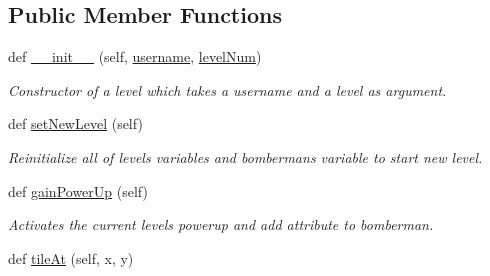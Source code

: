\subsection*{Public Member Functions}
\begin{DoxyCompactItemize}
\item 
\hypertarget{classsrc_1_1level_1_1_level_ab6e52c74e02be818576be2ffd9040fe0}{}def \hyperlink{classsrc_1_1level_1_1_level_ab6e52c74e02be818576be2ffd9040fe0}{\+\_\+\+\_\+init\+\_\+\+\_\+} (self, \hyperlink{classsrc_1_1level_1_1_level_a7ec8be181d4558bc3f7b8c106a6aeb5a}{username}, \hyperlink{classsrc_1_1level_1_1_level_a8b26c1249a2d161c058595e789948bf9}{level\+Num})\label{classsrc_1_1level_1_1_level_ab6e52c74e02be818576be2ffd9040fe0}

\begin{DoxyCompactList}\small\item\em Constructor of a level which takes a username and a level as argument. \end{DoxyCompactList}\item 
\hypertarget{classsrc_1_1level_1_1_level_a0df76bcc440bbab23e4ce754223177c5}{}def \hyperlink{classsrc_1_1level_1_1_level_a0df76bcc440bbab23e4ce754223177c5}{set\+New\+Level} (self)\label{classsrc_1_1level_1_1_level_a0df76bcc440bbab23e4ce754223177c5}

\begin{DoxyCompactList}\small\item\em Reinitialize all of level\textquotesingle{}s variables and bomberman\textquotesingle{}s variable to start new level. \end{DoxyCompactList}\item 
\hypertarget{classsrc_1_1level_1_1_level_a9af98db5112ae2fbd4a9f44ae0bcbe83}{}def \hyperlink{classsrc_1_1level_1_1_level_a9af98db5112ae2fbd4a9f44ae0bcbe83}{gain\+Power\+Up} (self)\label{classsrc_1_1level_1_1_level_a9af98db5112ae2fbd4a9f44ae0bcbe83}

\begin{DoxyCompactList}\small\item\em Activates the current level\textquotesingle{}s powerup and add attribute to bomberman. \end{DoxyCompactList}\item 
\hypertarget{classsrc_1_1level_1_1_level_a9f1a64a223be266425f6100e4728df3a}{}def \hyperlink{classsrc_1_1level_1_1_level_a9f1a64a223be266425f6100e4728df3a}{tile\+At} (self, x, y)\label{classsrc_1_1level_1_1_level_a9f1a64a223be266425f6100e4728df3a}


\end{DoxyCompactItemize}
